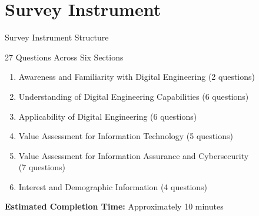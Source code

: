 \documentclass{beamer}
\begin{document}
\section{Survey Instrument}
\begin{frame}[allowframebreaks]{Survey Instrument Structure}
  \begin{block}{27 Questions Across Six Sections}
    \begin{small}
      \begin{enumerate}
        \item Awareness and Familiarity with Digital Engineering (2 questions)
        \item Understanding of Digital Engineering Capabilities (6 questions)
        \item Applicability of Digital Engineering (6 questions)
        \item Value Assessment for Information Technology (5 questions)
        \item Value Assessment for Information Assurance and Cybersecurity\\(7 questions)
        \item Interest and Demographic Information (4 questions)
      \end{enumerate}
    \end{small}
  \end{block}

  \vspace{0.2cm}
  \textbf{Estimated Completion Time:} Approximately 10 minutes
\end{frame}

\end{document}
